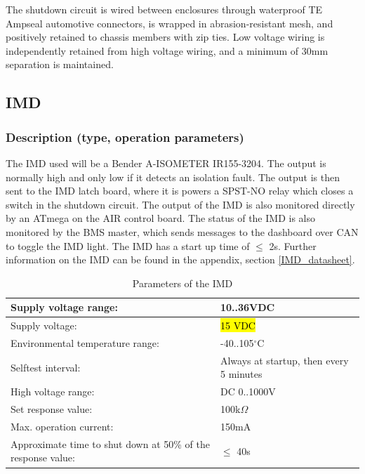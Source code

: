 \documentclass{article}
\begin{document}
The shutdown circuit is wired between enclosures through waterproof TE Ampseal automotive connectors, is wrapped in abrasion-resistant mesh, and positively retained to chassis members with zip ties. Low voltage wiring is independently retained from high voltage wiring, and a minimum of 30mm separation is maintained. 


\subsection{IMD}\label{imd}
\subsubsection{Description (type, operation parameters)}%

The IMD used will be a Bender A-ISOMETER IR155-3204. The output is normally high and only low if it detects an isolation fault. The output is then sent to the IMD latch board, where it is powers a SPST-NO relay which closes a switch in the shutdown circuit. The output of the IMD is also monitored directly by an ATmega on the AIR control board. The status of the IMD is also monitored by the BMS master, which sends messages to the dashboard over CAN to toggle the IMD light. The IMD has a start up time of $\leq$ 2s. Further information on the IMD can be found in the appendix, section \ref{IMD_datasheet}.






\begin{center}
	\begin{table}[H]
		\begin{tabular}{|l|l|}
			\hline
			Supply voltage range: &  10..36VDC \\
			\hline
			Supply voltage: &  \hl{15 VDC}\\
			\hline
			Environmental temperature range: &  -40..105$^{\circ}$C \\
			\hline
			Selftest interval: &  Always at startup, then every 5 minutes \\
			\hline
			High voltage range: &  DC 0..1000V \\
			\hline
			Set response value: &  100k$\Omega$ \\
			\hline
			Max. operation current: &  150mA \\
			\hline
			Approximate time to shut down at 50\% of the response value:&  $\leq$ 40s \\
			\hline
		\end{tabular}
		\caption{Parameters of the IMD}
		\label{IMDParameters}
	\end{table}
\end{center}
\end{document}
